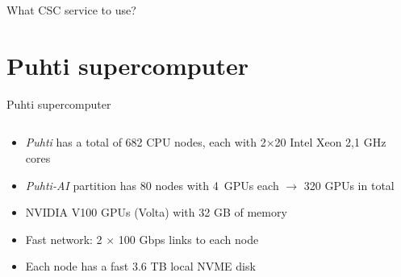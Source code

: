 \documentclass[aspectratio=1610,14pt]{beamer}
\newcommand{\vitem}{\vfill\item}
\begin{document}
\begin{frame}{What CSC service to use?}
\end{frame}

\section{Puhti supercomputer}

\begin{frame}{Puhti supercomputer}
  \begin{columns}
    \begin{column}{0.76\linewidth}
      \begin{minipage}[c][0.8\textheight][s]{\columnwidth}
      \begin{itemize}
        \vitem \emph{Puhti} has a total of 682 CPU nodes, each with 2$\times$20 Intel Xeon 2,1 GHz cores
        \vitem \emph{Puhti-AI} partition has 80 nodes with \mbox{4 GPUs}
        each $\rightarrow$ 320 GPUs in total
        \vitem NVIDIA V100 GPUs (Volta) with 32 GB of memory
        \vitem Fast network: 2 $\times$ 100 Gbps links to each node
        \vitem Each node has a fast 3.6 TB local NVME disk
      \end{itemize}
      \vfill
      \end{minipage}
    \end{column}
    \begin{column}{0.24\linewidth}

\end{column}
\end{columns}
\end{frame}
\end{document}
